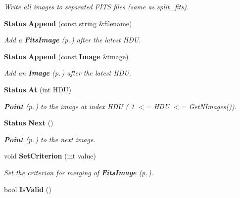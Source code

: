 \begin{CompactItemize}
\begin{CompactList}\small\item\em Write all images to separated FITS files (same as split\_\-fits).\item\end{CompactList}\item 
{\bf Status} {\bf Append} (const string \&filename)
\begin{CompactList}\small\item\em Add a {\bf Fits\-Image} {\rm (p.\,\pageref{class_fitsimage})} after the latest HDU.\item\end{CompactList}\item 
{\bf Status} {\bf Append} (const {\bf Image} \&image)
\begin{CompactList}\small\item\em Add an {\bf Image} {\rm (p.\,\pageref{class_image})} after the latest HDU.\item\end{CompactList}\item 
{}
{\bf Status} {\bf At} (int HDU)\label{class_fitsimagearray_a8}

\begin{CompactList}\small\item\em {\bf Point} {\rm (p.\,\pageref{class_point})} to the image at index HDU ( 1 $<$= HDU $<$= Get\-NImages()).\item\end{CompactList}\item 
{}
{\bf Status} {\bf Next} ()\label{class_fitsimagearray_a9}

\begin{CompactList}\small\item\em {\bf Point} {\rm (p.\,\pageref{class_point})} to the next image.\item\end{CompactList}\item 
void {\bf Set\-Criterion} (int value)
\begin{CompactList}\small\item\em Set the criterion for merging of {\bf Fits\-Image} {\rm (p.\,\pageref{class_fitsimage})}.\item\end{CompactList}\item 
{}
bool {\bf Is\-Valid} ()\label{class_fitsimagearray_a11}


\end{CompactItemize}
